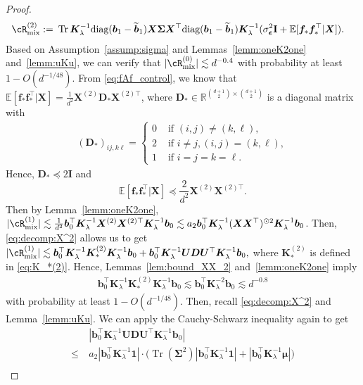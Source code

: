 \documentclass[twoside,11pt]{article}
\newcommand{\bepsilon}{\boldsymbol{\epsilon}}
\newcommand{\R}{\mathbb{R}}
\newcommand{\E}{\mathbb{E}}
\def\bI{{\mathbf I}}
\newcommand{\diag}{\text{diag}}
\def\bD{{\boldsymbol D}}
\def\vf{{\boldsymbol f}}
\def\bK{{\boldsymbol K}}
\def\bU{{\boldsymbol U}}
\def\bX{{\boldsymbol X}}
\def\bb{{\boldsymbol b}}
\def\bSigma{{\boldsymbol \Sigma}}
\renewcommand{\bK}{\boldsymbol{K}}
\newcommand{\Tr}{\operatorname{Tr}}
\newcommand{\vmu}{\mbi{\mu}}
\newcommand{\mix}{\textnormal{mix}}
\newcommand{\1}{\mathbf{1}}
\def\mbi#1{\boldsymbol{#1}}
\def\mbi#1{\boldsymbol{#1}} %
\begin{document}
\begin{proof}
\begin{align}
    \cR_{\mix}^{(2)}:=~& \Tr\bK_{\lambda}^{-1}\diag(\bb_1-\widetilde\bb_1)\bX\bSigma\bX^\top\diag(\bb_1-\widetilde\bb_1) \bK_{\lambda}^{-1} (\sigma^2_{\bepsilon} \bI+\E[\vf_*\vf_*^\top|\bX] ).
\end{align}
Based on Assumption~\ref{assump:sigma} and Lemmas~\ref{lemm:oneK2one} and~\ref{lemm:uKu}, we can verify that $|\cR_{\mix}^{(0)}|\lesssim d^{-0.4}$  with probability at least $1-O(d^{-1/48})$. From \eqref{eq:fAf_control}, we know that 
$\E[\vf_*\vf_*^\top|\bX]=\frac{1}{d^2} \bX^{(2)}\bD_*\bX^{(2)\top}$, 
where $\bD_*\in\R^{\binom{d+1}{2}\times\binom{d+1}{2}}$ is a diagonal matrix with 
\begin{align}  
(\bD_*)_{ij, k\ell} =\begin{cases}
    0 & \text{ if } (i,j)\not=(k,\ell),\\
    2  &\text{ if } i\not=j, (i,j)=(k,\ell), \\
    1 &\text{ if } i=j=k=\ell.
\end{cases}
\end{align} 
Hence, $\bD_*\preccurlyeq 2\bI$ and 
\begin{equation}\label{eq:bound_ff^T}
    \E[\vf_*\vf_*^\top|\bX]\preccurlyeq \frac{2}{d^2} \bX^{(2)} \bX^{(2)\top}.
\end{equation}
Then by Lemma~\ref{lemm:oneK2one},
 $|\cR_{\mix}^{(1)}|\lesssim \frac{1}{d^2}\bb_0^\top\bK_{\lambda}^{-1}\bX^{(2)} \bX^{(2)\top}\bK_{\lambda}^{-1} \bb_0\lesssim a_2\bb_0^\top \bK_{\lambda}^{-1}(\bX\bX^\top)^{\odot 2} \bK_{\lambda}^{-1}\bb_0$.
Then, \eqref{eq:decomp:X^2} allows us to get
$ |\cR_{\mix}^{(1)}|\lesssim  \bb_0^\top \bK_{\lambda}^{-1}\bK_*^{(2)}\bK_{\lambda}^{-1}\bb_0+\bb_0^\top\bK_{\lambda}^{-1}\bU\bD\bU^\top\bK_{\lambda}^{-1}\bb_0,$
where $\bK_*^{(2)}$ is defined in \eqref{eq:K_*(2)}. Hence, Lemmas~\ref{lem:bound_XX_2} and~\ref{lemm:oneK2one} imply 
\begin{align}
   \bb_0^\top\bK_{\lambda}^{-1}\bK_*^{(2)}\bK_{\lambda}^{-1}\bb_0\lesssim \bb_0^\top\bK_{\lambda}^{-2} \bb_0\lesssim d^{-0.8}
\end{align}  
with probability at least $1-O(d^{-1/48})$. Then, recall \eqref{eq:decomp:X^2} and Lemma~\ref{lemm:uKu}. We can apply the Cauchy-Schwarz inequality again to get
\begin{align}
&|\bb_0^\top\bK_{\lambda}^{-1}\bU\bD\bU^\top\bK_{\lambda}^{-1}\bb_0|\\\le~&  a_2|\bb_0^\top\bK_{\lambda}^{-1}\1|\cdot\big(\Tr(\bSigma^2)|\bb_0^\top\bK_{\lambda}^{-1}\1|+|\bb_0^\top\bK_{\lambda}^{-1}\vmu|\big)\\

\end{align}
\end{proof}
\end{document}
